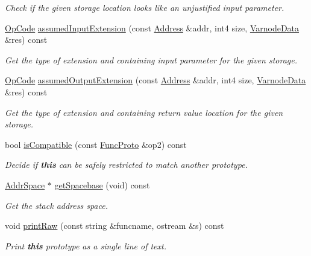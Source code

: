 \begin{DoxyCompactItemize}
\begin{DoxyCompactList}\small\item\em Check if the given storage location looks like an {\itshape unjustified} input parameter. \end{DoxyCompactList}\item 
\mbox{\hyperlink{opcodes_8hh_abeb7dfb0e9e2b3114e240a405d046ea7}{Op\+Code}} \mbox{\hyperlink{class_func_proto_ace1a73b8df1756f6945df97319270508}{assumed\+Input\+Extension}} (const \mbox{\hyperlink{class_address}{Address}} \&addr, int4 size, \mbox{\hyperlink{struct_varnode_data}{Varnode\+Data}} \&res) const
\begin{DoxyCompactList}\small\item\em Get the type of extension and containing input parameter for the given storage. \end{DoxyCompactList}\item 
\mbox{\hyperlink{opcodes_8hh_abeb7dfb0e9e2b3114e240a405d046ea7}{Op\+Code}} \mbox{\hyperlink{class_func_proto_a2550a272235e295512ee5eb7a2674638}{assumed\+Output\+Extension}} (const \mbox{\hyperlink{class_address}{Address}} \&addr, int4 size, \mbox{\hyperlink{struct_varnode_data}{Varnode\+Data}} \&res) const
\begin{DoxyCompactList}\small\item\em Get the type of extension and containing return value location for the given storage. \end{DoxyCompactList}\item 
bool \mbox{\hyperlink{class_func_proto_aa5ee60788e6d8b4de304e2c5955a393b}{is\+Compatible}} (const \mbox{\hyperlink{class_func_proto}{Func\+Proto}} \&op2) const
\begin{DoxyCompactList}\small\item\em Decide if {\bfseries{this}} can be safely restricted to match another prototype. \end{DoxyCompactList}\item 
\mbox{\hyperlink{class_addr_space}{Addr\+Space}} $\ast$ \mbox{\hyperlink{class_func_proto_a41cf46f20373d37b4a7cf22201112abb}{get\+Spacebase}} (void) const
\begin{DoxyCompactList}\small\item\em Get the {\itshape stack} address space. \end{DoxyCompactList}\item 
void \mbox{\hyperlink{class_func_proto_acf8d609764a4fd6c38cb0c284f225180}{print\+Raw}} (const string \&funcname, ostream \&s) const
\begin{DoxyCompactList}\small\item\em Print {\bfseries{this}} prototype as a single line of text. \end{DoxyCompactList}\item 

\end{DoxyCompactItemize}
